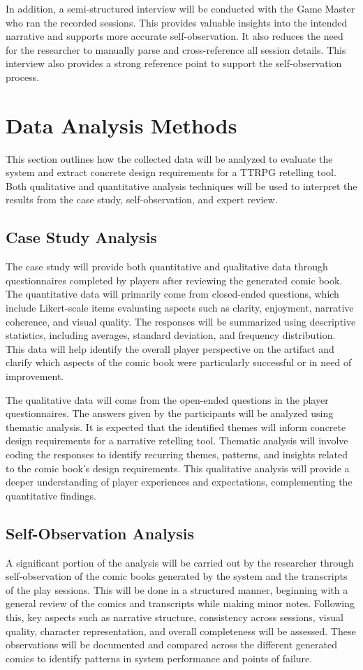 In addition, a semi-structured interview will be conducted with the Game Master who ran the recorded sessions. This provides valuable insights into the intended narrative and supports more accurate self-observation. It also reduces the need for the researcher to manually parse and cross-reference all session details. This interview also provides a strong reference point to support the self-observation process.

\section{Data Analysis Methods}
This section outlines how the collected data will be analyzed to evaluate the system and extract concrete design requirements for a TTRPG retelling tool. Both qualitative and quantitative analysis techniques will be used to interpret the results from the case study, self-observation, and expert review.

\subsection*{Case Study Analysis}
The case study will provide both quantitative and qualitative data through questionnaires completed by players after reviewing the generated comic book. The quantitative data will primarily come from closed-ended questions, which include Likert-scale items evaluating aspects such as clarity, enjoyment, narrative coherence, and visual quality. The responses will be summarized using descriptive statistics, including averages, standard deviation, and frequency distribution. This data will help identify the overall player perspective on the artifact and clarify which aspects of the comic book were particularly successful or in need of improvement.

The qualitative data will come from the open-ended questions in the player questionnaires. The answers given by the participants will be analyzed using thematic analysis. It is expected that the identified themes will inform concrete design requirements for a narrative retelling tool. Thematic analysis will involve coding the responses to identify recurring themes, patterns, and insights related to the comic book's design requirements. This qualitative analysis will provide a deeper understanding of player experiences and expectations, complementing the quantitative findings.

\subsection*{Self-Observation Analysis}
A significant portion of the analysis will be carried out by the researcher through self-observation of the comic books generated by the system and the transcripts of the play sessions. This will be done in a structured manner, beginning with a general review of the comics and transcripts while making minor notes. Following this, key aspects such as narrative structure, consistency across sessions, visual quality, character representation, and overall completeness will be assessed. These observations will be documented and compared across the different generated comics to identify patterns in system performance and points of failure.

